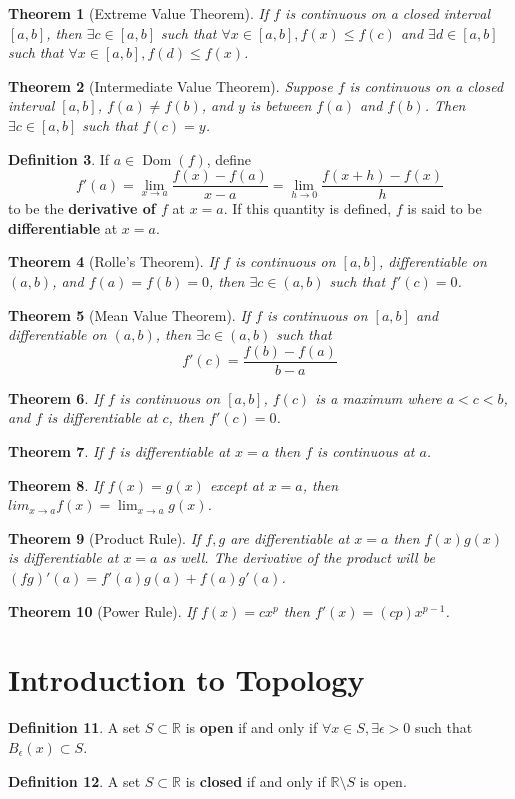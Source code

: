 \documentclass[11pt]{amsart}
\newtheorem{theorem}{Theorem}[section]
\theoremstyle{definition}
\newtheorem{definition}[theorem]{Definition}
\newcommand{\reals}{\mathbb{R}}
\DeclareMathOperator{\Dom}{Dom}
\begin{document}
\begin{theorem}[Extreme Value Theorem]
	If $f$ is continuous on a closed interval $[a, b]$, then $\exists c \in [a, b]$ such that $\forall x \in [a, b], f(x) \leq f(c)$ and
	$\exists d \in [a, b]$ such that $\forall x \in [a, b], f(d) \leq f(x)$.
\end{theorem}
\begin{theorem}[Intermediate Value Theorem]
	Suppose $f$ is continuous on a closed interval $[a, b]$, $f(a) \neq f(b)$, and $y$ is between $f(a)$ and $f(b)$. Then 
	$\exists c \in [a, b]$ such that $f(c) = y$.
\end{theorem}
\begin{definition}
	If $a \in \Dom(f)$, define
	\[ f'(a) = \lim_{x \to a} \frac{f(x) - f(a)}{x - a} = \lim_{h \to 0} \frac{f(x+h) - f(x)}{h} \]
	to be the \textbf{derivative of $f$} at $x = a$. If this quantity is defined, $f$ is said to be \textbf{differentiable} at $x = a$.
\end{definition}
\begin{theorem}[Rolle's Theorem]
	If $f$ is continuous on $[a, b]$, differentiable on $(a, b)$, and $f(a) = f(b) = 0$, then $\exists c \in (a, b)$ such that $f'(c) = 0$.
\end{theorem}
\begin{theorem}[Mean Value Theorem]
	If $f$ is continuous on $[a, b]$ and differentiable on $(a, b)$, then $\exists c \in (a, b)$ such that
	\[ f'(c) = \frac{f(b) - f(a)}{b - a} \]
\end{theorem}
\begin{theorem}
	If $f$ is continuous on $[a, b]$, $f(c)$ is a maximum where $a < c < b$, and $f$ is differentiable at $c$, then $f'(c) = 0$.
\end{theorem}
\begin{theorem}
	If $f$ is differentiable at $x = a$ then $f$ is continuous at $a$.
\end{theorem}
\begin{theorem}
	If $f(x) = g(x)$ except at $x = a$, then $lim_{x \to a} f(x) = \lim_{x \to a} g(x)$.
\end{theorem}
\begin{theorem}[Product Rule]
	If $f, g$ are differentiable at $x = a$ then $f(x)g(x)$ is differentiable at $x = a$ as well. The derivative of the product will be 
	$(fg)'(a) = f'(a)g(a) + f(a)g'(a)$.
\end{theorem}
\begin{theorem}[Power Rule]
	If $f(x) = cx^p$ then $f'(x) = (cp)x^{p - 1}$.
\end{theorem}

\section{Introduction to Topology}
\begin{definition}
	A set $S \subset \reals$ is \textbf{open} if and only if $\forall x \in S, \exists \epsilon > 0$ such that $B_{\epsilon}(x) \subset S$.
\end{definition}
\begin{definition}
	A set $S \subset \reals$ is \textbf{closed} if and only if $\reals \setminus S$ is open.
\end{definition}
\end{document}
